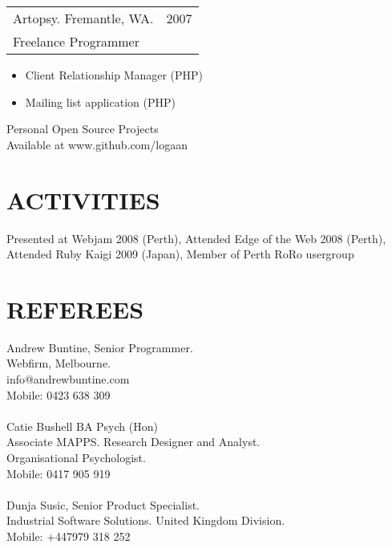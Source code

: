 \documentclass[margin]{res}
\begin{document}
\begin{resume}
  \begin{tabular}{p{3.5in} r}
    Artopsy. Fremantle, WA. & 2007 \\
    Freelance Programmer
  \end{tabular}	
  \begin{itemize}
  \item Client Relationship Manager (PHP)
  \item Mailing list application (PHP)
  \end{itemize} 

  Personal Open Source Projects \\
  Available at www.github.com/logaan

  \section{ACTIVITIES}
  Presented at Webjam 2008 (Perth), Attended Edge of the Web 2008 (Perth), Attended
  Ruby Kaigi 2009 (Japan), Member of Perth RoRo usergroup
  
  \section{REFEREES}
  Andrew Buntine, Senior Programmer. \\
  Webfirm, Melbourne. \\
  info@andrewbuntine.com \\
  Mobile: 0423 638 309 \\
  \\
  Catie Bushell BA Psych (Hon) \\
  Associate MAPPS. Research Designer and Analyst. \\
  Organisational Psychologist. \\
  Mobile: 0417 905 919 \\
  \\
  Dunja Susic, Senior Product Specialist. \\
  Industrial Software Solutions. United Kingdom Division. \\
  Mobile: +447979 318 252
  
\end{resume} 
\end{document}
